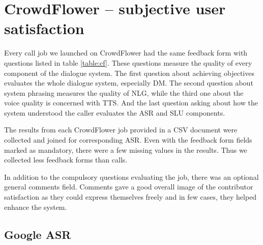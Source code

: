 \section{CrowdFlower -- subjective user satisfaction}

Every call job we launched on CrowdFlower had the same feedback form with questions listed in table \ref{table:cf}.
These questions measure the quality of every component of the dialogue system.
The first question about achieving objectives evaluates the whole dialogue system, especially DM.
The second question about system phrasing measures the quality of NLG, while the third one about the voice quality is concerned with TTS.
And the last question asking about how the system understood the caller evaluates the ASR and SLU components.


\begin{table}[h]
\centering
\hspace*{-3pt}
\caption[CrowdFlower feedback form questions]{CrowdFlower feedback form questions with choice ranges.}
\label{table:cf}
\end{table}

The results from each CrowdFlower job provided in a CSV document were collected and joined for corresponding ASR.
Even with the feedback form fields marked as mandatory, there were a few missing values in the results.
Thus we collected less feedback forms than calls.

In addition to the compulsory questions evaluating the job, there was an optional general comments field.
Comments gave a good overall image of the contributor satisfaction as they could express themselves freely and in few cases, they helped enhance the system.

\subsection{Google ASR}

